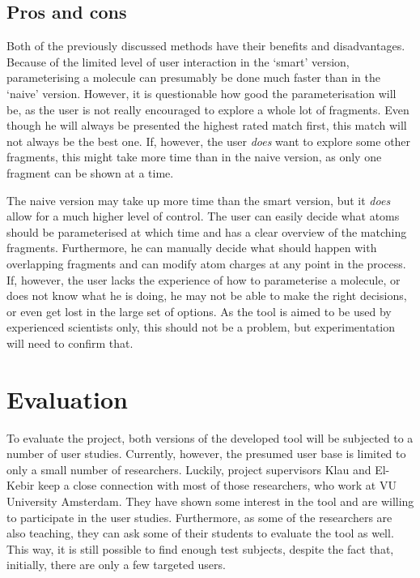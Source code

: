 \subsection{Pros and cons}
Both of the previously discussed methods have their benefits and disadvantages. Because of the limited level of user interaction in the `smart' version, parameterising a molecule can presumably be done much faster than in the `naive'  version. However, it is questionable how good the parameterisation will be, as the user is not really encouraged to explore a whole lot of fragments. Even though he will always be presented the highest rated match first, this match will not always be the best one. If, however, the user \emph{does} want to explore some other fragments, this might take more time than in the naive version, as only one fragment can be shown at a time.

The naive version may take up more time than the smart version, but it \emph{does} allow for a much higher level of control. The user can easily decide what atoms should be parameterised at which time and has a clear overview of the matching fragments. Furthermore, he can manually decide what should happen with overlapping fragments and can modify atom charges at any point in the process. If, however, the user lacks the experience of how to parameterise a molecule, or does not know what he is doing, he may not be able to make the right decisions, or even get lost in the large set of options. As the tool is aimed to be used by experienced scientists only, this should not be a problem, but experimentation will need to confirm that.


\section{Evaluation}

To evaluate the project, both versions of the developed tool will be subjected to a number of user studies. Currently, however, the presumed user base is limited to only a small number of researchers. Luckily, project supervisors Klau and El-Kebir keep a close connection with most of those researchers, who work at VU University Amsterdam. They have shown some interest in the tool and are willing to participate in the user studies. Furthermore, as some of the researchers are also teaching, they can ask some of their students to evaluate the tool as well. This way, it is still possible to find enough test subjects, despite the fact that, initially, there are only a few targeted users.

